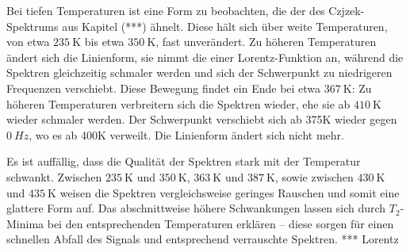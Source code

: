 Bei tiefen Temperaturen ist eine Form zu beobachten, die der des Czjzek-Spektrums aus Kapitel (***) ähnelt. Diese hält sich über weite Temperaturen, von etwa $\SI{235}{\kelvin}$ bis etwa $\SI{350}{\kelvin}$, fast unverändert. Zu höheren Temperaturen ändert sich die Linienform, sie nimmt die einer Lorentz-Funktion an, während die Spektren gleichzeitig schmaler werden und sich der Schwerpunkt zu niedrigeren Frequenzen verschiebt. Diese Bewegung findet ein Ende bei etwa $\SI{367}{\kelvin}$: Zu höheren Temperaturen verbreitern sich die Spektren wieder, ehe sie ab $\SI{410}{\kelvin}$ wieder schmaler werden. Der Schwerpunkt verschiebt sich ab 375K wieder gegen $\SI{0}{Hz}$, wo es ab 400K verweilt. Die Linienform ändert sich nicht mehr.

Es ist auffällig, dass die Qualität der Spektren stark mit der Temperatur schwankt. Zwischen $\SI{235}{\kelvin}$ und $\SI{350}{\kelvin}$, $\SI{363}{\kelvin}$ und $\SI{387}{\kelvin}$, sowie zwischen $\SI{430}{\kelvin}$ und $\SI{435}{\kelvin}$ weisen die Spektren vergleichsweise geringes Rauschen und somit eine glattere Form auf. Das abschnittweise höhere Schwankungen lassen sich durch $T_2$-Minima bei den entsprechenden Temperaturen erklären -- diese sorgen für einen schnellen Abfall des Signals und entsprechend verrauschte Spektren. *** Lorentz

